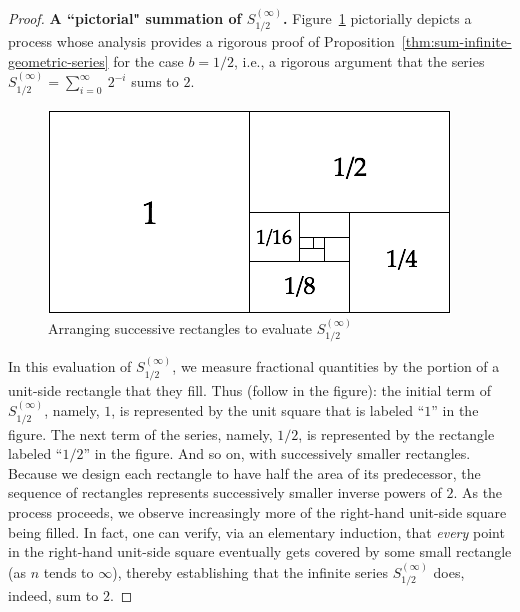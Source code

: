 \begin{proof}
{\bf A ``pictorial" summation of $S^{(\infty)}_{1/2}$.}
Figure~\ref{fig:sumGeoBasis} pictorially depicts a process whose analysis provides a rigorous proof of Proposition~\ref{thm:sum-infinite-geometric-series} for the case $b = 1/2$, i.e., a rigorous argument that the series $S^{(\infty)}_{1/2} = \sum_{i=0}^\infty \ 2^{-i}$ sums to $2$.
\begin{figure}[htb]
\begin{center}
       \includegraphics[scale=0.35]{FiguresMaths/SumGeometric1sur2Bis}
 \caption{Arranging successive rectangles to evaluate $S^{(\infty)}_{1/2}$}
       \label{fig:sumGeoBasis}
\end{center}
\end{figure}
In this evaluation of $S^{(\infty)}_{1/2}$, we measure fractional quantities by the portion of a unit-side rectangle that they fill.  Thus (follow in the figure): the initial term of $S^{(\infty)}_{1/2}$, namely, $1$, is represented by the unit square that is labeled ``$1$'' in the figure.  The next term of the series, namely, $1/2$, is represented by the rectangle labeled ``$1/2$'' in the figure.  And so on, with successively smaller rectangles.  Because we design each rectangle to have half the area of its predecessor, the sequence of rectangles represents successively smaller inverse powers of $2$.  As the process proceeds, we observe increasingly more of the right-hand unit-side square being filled.  In fact, one can verify, via an elementary induction, that {\em every} point in the right-hand unit-side square eventually gets covered by some small rectangle (as $n$ tends to $\infty$), thereby establishing that the infinite series $S^{(\infty)}_{1/2}$ does, indeed, sum to $2$.

\bigskip


\end{proof}
